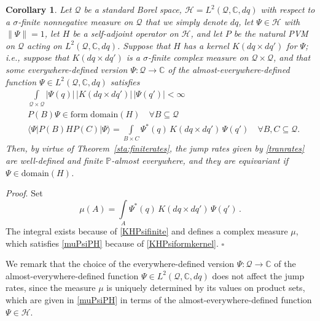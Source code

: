 \documentclass[12pt]{article}
\newcommand{\CCC}{\mathbb{C}} %
\newcommand{\1}{\mathbf{1}} %
\newcommand{\Hilbert}{\mathscr{H}}
\renewcommand{\sp}[2]{\langle #1 | #2 \rangle} %
\newcommand{\conf}{\mathcal{Q}} %
\newcommand{\measure}{\mathbb{P}} %
\newcommand{\pov}{{P}}%
\newtheorem{corollary}{Corollary}
\newenvironment{proof}{\noindent 
\textit{Proof}.}{\hfill$\square$\bigskip}
\begin{document}
\begin{corollary}\label{sta:Ltwokernel}
   Let $\conf$ be a standard Borel space, $\Hilbert = L^2 (\conf,
   \CCC, dq)$ with respect to a $\sigma$-finite nonnegative measure on
   $\conf$ that we simply denote $dq$, let $\Psi \in \Hilbert$ with
   $\|\Psi\| =1$, let $H$ be a self-adjoint operator on $\Hilbert$,
   and let $\pov$ be the natural PVM on $\conf$ acting on $L^2 (\conf,
   \CCC, dq)$. Suppose that $H$ has a kernel $K(dq \times dq')$ for
   $\Psi$; i.e., suppose that $K(dq \times dq')$ is a $\sigma$-finite
   complex measure on $\conf \times \conf$, and that some
   everywhere-defined version $\Psi:\conf \to \CCC$ of the
   almost-everywhere-defined function $\Psi \in L^2(\conf,\CCC,dq)$
   satisfies 
   \begin{subequations}\label{KHPsi}
    \begin{align} &
     \int\limits_{\conf \times \conf} |\Psi(q)| \, |K(dq \times dq')|
     \, |\Psi(q')| < \infty \label{KHPsifinite}\\ & \pov(B) \Psi \in
     \mathrm{form \; domain}(H) \quad \forall B \subseteq \conf
     \label{KHPsiformdomain}\\
     & \sp{\Psi}{\pov(B) H \pov(C) |\Psi} = \int\limits_{B \times C}
     \Psi^*(q) \, K(dq \times dq') \, \Psi(q') \quad \forall B,C
     \subseteq \conf. \label{KHPsiformkernel} 
    \end{align}
   \end{subequations}
   Then, by virtue of Theorem~\ref{sta:finiterates}, the jump rates
   given by \eqref{tranrates} are well-defined and finite
   $\measure$-almost everywhere, and they are equivariant if $\Psi \in
   \mathrm{domain}(H)$.
\end{corollary}

\begin{proof}
Set
\begin{equation}\label{mudef}
   \mu(A) = \int\limits_{A} \Psi^*(q) \, K(dq \times dq') \,
   \Psi(q')\,.
\end{equation}
The integral exists because of \eqref{KHPsifinite} and defines a
complex measure $\mu$, which satisfies \eqref{muPsiPH} because of
\eqref{KHPsiformkernel}.
\end{proof}

We remark that the choice of the everywhere-defined version $\Psi:
\conf \to \CCC$ of the almost-everywhere-defined function $\Psi \in
L^2(\conf, \CCC, dq)$ does not affect the jump rates, since the
measure $\mu$ is uniquely determined by its values on product sets,
which are given in \eqref{muPsiPH} in terms of the
almost-everywhere-defined function $\Psi \in \Hilbert$.
\end{document}
